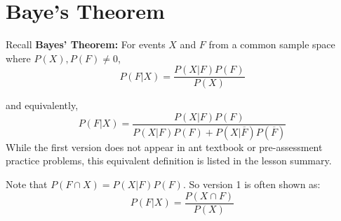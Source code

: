 \documentclass{exam}
\newcommand{\itemSpace}{36pt} %
\begin{document}
\section*{Baye's Theorem}
\begin{questions}
\setlength\itemsep{\itemSpace} %
    \begin{solution}
        Recall \textbf{Bayes' Theorem:} For events $X$ and $F$ from a common sample space where $P(X),P(F)\neq 0$, 
        \begin{equation}\label{eqn: bayes1}
            P(F|X)=\frac{P(X|F)P(F)}{P(X)}\tag{version 1}
        \end{equation}

        and equivalently,
        \begin{equation}
            P(F|X)=\displaystyle \frac{P(X|F)P(F)}{P(X|F)P(F)+P(X|\overline{F})P(\overline{F})}\tag{version 2}
        \end{equation}
        While the first version does not appear in ant textbook or pre-assessment practice problems, this equivalent definition is listed in the lesson summary. 
        
        Note that $P(F\cap X)=P(X|F)P(F)$. So version 1 is often shown as:
        \begin{equation}\label{eqn: bayes1}
            P(F|X)=\frac{P(X\cap F)}{P(X)}\tag{version 3}
        \end{equation}
    \end{solution}
    

\end{questions}
\end{document}
